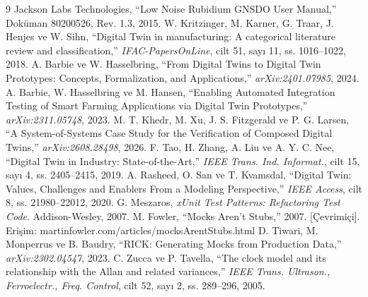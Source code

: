 \documentclass[9pt,twocolumn,a4paper]{extarticle}
\begin{document}

\begin{thebibliography}{9}
\footnotesize
{} Jackson Labs Technologies, ``Low Noise Rubidium GNSDO User Manual,'' Doküman 80200526, Rev. 1.3, 2015.
 W. Kritzinger, M. Karner, G. Traar, J. Henjes ve W. Sihn, ``Digital Twin in manufacturing: A categorical literature review and classification,'' \textit{IFAC-PapersOnLine}, cilt 51, sayı 11, ss. 1016--1022, 2018.
 A. Barbie ve W. Hasselbring, ``From Digital Twins to Digital Twin Prototypes: Concepts, Formalization, and Applications,'' \textit{arXiv:2401.07985}, 2024.
 A. Barbie, W. Hasselbring ve M. Hansen, ``Enabling Automated Integration Testing of Smart Farming Applications via Digital Twin Prototypes,'' \textit{arXiv:2311.05748}, 2023.
 M. T. Khedr, M. Xu, J. S. Fitzgerald ve P. G. Larsen, ``A System-of-Systems Case Study for the Verification of Composed Digital Twins,'' \textit{arXiv:2608.28498}, 2026.
 F. Tao, H. Zhang, A. Liu ve A. Y. C. Nee, ``Digital Twin in Industry: State-of-the-Art,'' \textit{IEEE Trans. Ind. Informat.}, cilt 15, sayı 4, ss. 2405--2415, 2019.
 A. Rasheed, O. San ve T. Kvamsdal, ``Digital Twin: Values, Challenges and Enablers From a Modeling Perspective,'' \textit{IEEE Access}, cilt 8, ss. 21980--22012, 2020.
 G. Meszaros, \textit{xUnit Test Patterns: Refactoring Test Code}. Addison-Wesley, 2007.
 M. Fowler, ``Mocks Aren't Stubs,'' 2007. [Çevrimiçi]. Erişim: martinfowler.com/articles/mocksArentStubs.html
 D. Tiwari, M. Monperrus ve B. Baudry, ``RICK: Generating Mocks from Production Data,'' \textit{arXiv:2302.04547}, 2023.
 C. Zucca ve P. Tavella, ``The clock model and its relationship with the Allan and related variances,'' \textit{IEEE Trans. Ultrason., Ferroelectr., Freq. Control}, cilt 52, sayı 2, ss. 289--296, 2005.
\end{thebibliography}
\end{document}
